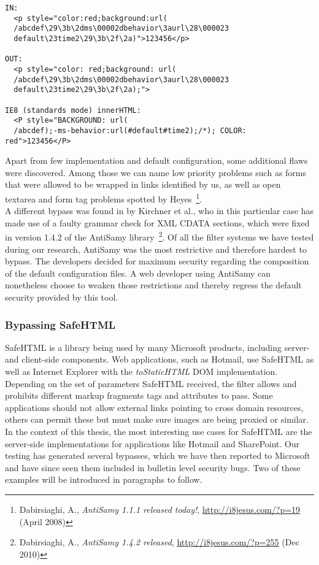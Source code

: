 \begin{lstlisting}[label=lst:bypassing-antisamy,caption=Bypassing AntiSamy with innerHTML; automatic decoding by the user agent layout engine renders the harmless string to be malicious,captionpos=b]
IN: 
  <p style="color:red;background:url(
  /abcdef\29\3b\2dms\00002dbehavior\3aurl\28\000023
  default\23time2\29\3b\2f\2a)">123456</p>

OUT: 
  <p style="color: red;background: url(
  /abcdef\29\3b\2dms\00002dbehavior\3aurl\28\000023
  default\23time2\29\3b\2f\2a);">

IE8 (standards mode) innerHTML: 
  <P style="BACKGROUND: url(
  /abcdef);-ms-behavior:url(#default#time2);/*); COLOR: red">123456</P> 

\end{lstlisting}

      Apart from few implementation and default configuration, some additional flaws were discovered. Among those we can name low priority problems such as forms that were allowed to be wrapped in links identified by us, as well as open textarea and form tag problems spotted by Heyes~\footnote{Dabirsiaghi, A., \textit{AntiSamy 1.1.1 released today!}, \url{http://i8jesus.com/?p=19} (April 2008)}. \\

      A different bypass was found in by Kirchner et al., who in this particular case has made use of a faulty grammar check for XML CDATA sections, which were fixed in version 1.4.2 of the AntiSamy library~\footnote{Dabirsiaghi, A., \textit{AntiSamy 1.4.2 released}, \url{http://i8jesus.com/?p=255} (Dec 2010)}. Of all the filter systems we have tested during our research, AntiSamy was the most restrictive and therefore hardest to bypass. The developers decided for maximum security regarding the composition of the default configuration files. A web developer using AntiSamy can nonetheless choose to weaken those restrictions and thereby regress the default security provided by this tool. 

      \subsubsection{Bypassing SafeHTML}
      \label{subsubsubsec:5.4.6.3.bypassing_safehtml}

      SafeHTML is a library being used by many Microsoft products, including server- and client-side components. Web applications, such as Hotmail, use SafeHTML as well as Internet Explorer with the \textit{toStaticHTML} DOM implementation. Depending on the set of parameters SafeHTML received, the filter allows and prohibits different markup fragments tags and attributes to pass. Some applications should not allow external links pointing to cross domain resources, others can permit these but must make sure images are being proxied or similar. In the context of this thesis, the most interesting use cases for SafeHTML are the server-side implementations for applications like Hotmail and SharePoint. Our testing has generated several bypasses, which we have then reported to Microsoft and have since seen them included in bulletin level security bugs. Two of these examples will be introduced in paragraphs to follow.\\

